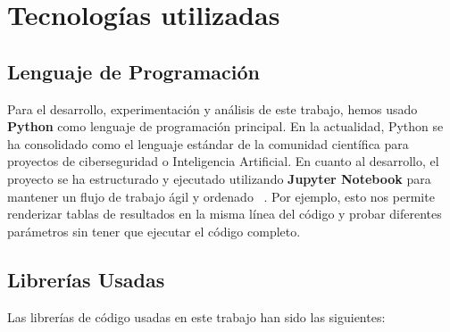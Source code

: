 \chapter{Tecnologías utilizadas}

\section{Lenguaje de Programación}

Para el desarrollo, experimentación y análisis de este trabajo, hemos usado \textbf{Python} como lenguaje de programación principal. En la actualidad, Python se ha consolidado como el lenguaje estándar de la comunidad científica para proyectos de ciberseguridad o Inteligencia Artificial.
En cuanto al desarrollo, el proyecto se ha estructurado y ejecutado utilizando \textbf{Jupyter Notebook} para mantener un flujo de trabajo ágil y ordenado ~\cite{vscode_jupyter_notebooks}. Por ejemplo, esto nos permite renderizar tablas de resultados en la misma línea del código y probar diferentes parámetros sin tener que ejecutar el código completo.

\section{Librerías Usadas}

Las librerías de código usadas en este trabajo han sido las siguientes:

